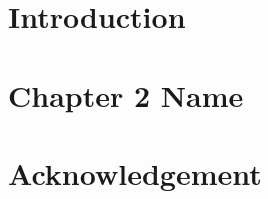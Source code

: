 \documentclass[12pt]{report}
\begin{document}

% 
% 


\tableofcontents
\newpage
\listoffigures
\newpage
\listoftables
\newpage
\chapter{Introduction}

\chapter{Chapter 2 Name}

\chapter{Acknowledgement}


\renewcommand{\bibname}{References}

%


\end{document}
